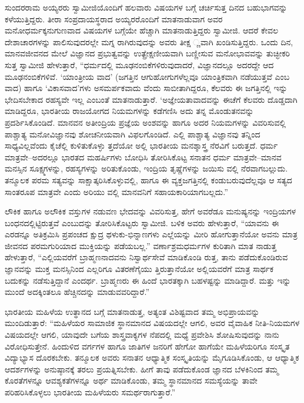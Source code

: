 ಸುಂದರರಾಮ ಅಯ್ಯರರು ಸ್ವಾಮೀಜಿಯೊಂದಿಗೆ ಹಲವಾರು ವಿಷಯಗಳ ಬಗ್ಗೆ ಚರ್ಚಿಸುತ್ತ ದಿನದ ಬಹುಭಾಗವನ್ನು ಕಳೆಯುತ್ತಿದ್ದರು. ತೀರಾ ಸಂಪ್ರದಾಯಸ್ಥರಾದ ಅಯ್ಯರರೊಂದಿಗೆ ಮಾತನಾಡುವಾಗ ಅವರ ಮನೋಧರ್ಮಕ್ಕನುಗುಣವಾದ ವಿಷಯಗಳ ಬಗ್ಗೆಯೇ ಹೆಚ್ಚಾಗಿ ಮಾತನಾಡುತ್ತಿದ್ದರು ಸ್ವಾಮೀಜಿ. ಆದರೆ ಕೇವಲ ದೇಶಾಚಾರಗಳನ್ನು ಪಾಲಿಸುವುದರಲ್ಲೇ ಮಗ್ನ ರಾಗಿರುವುದನ್ನು ಅವರು ತೀಕ್ಷ ್ಣವಾಗಿ ಖಂಡಿಸುತ್ತಿದ್ದರು. ಒಂದು ದಿನ, ಮಾನವಜೀವನದ ಮೇಲೆ ವಿಜ್ಞಾನದ ಪ್ರಭುತ್ವವನ್ನು ಉತ್ಪ್ರೇಕ್ಷಣೀಯವಾಗಿ ಬಣ್ಣೀಸುವ ಮನೋಭಾವವನ್ನು ತುಚ್ಛೀಕರಿ ಸುತ್ತ ಸ್ವಾಮೀಜಿ ಹೇಳುತ್ತಾರೆ, “ಧರ್ಮದಲ್ಲಿ ಮೂಢನಂಬಿಕೆಗಳಿರುವುದಾದರೆ, ವಿಜ್ಞಾನದಲ್ಲೂ ಅದರದ್ದೇ ಆದ ಮೂಢನಂಬಿಕೆಗಳಿವೆ. ‘ಯಾಂತ್ರೀಯ ವಾದ’ (ಜಗತ್ತಿನ ಆಗುಹೋಗುಗಳೆಲ್ಲವೂ ಯಾಂತ್ರಿಕವಾಗಿ ನಡೆಯುತ್ತವೆ ಎಂಬ ವಾದ) ಹಾಗೂ ‘ವಿಕಾಸವಾದ’ಗಳು ಅಸಮರ್ಪಕವಾದು ವೆಂದು ಸಾಬೀತಾಗಿದ್ದರೂ, ಕೆಲವರು ಈ ಜಗತ್ತಿನಲ್ಲಿ ಇನ್ನು ಭೇದಿಸಬೇಕಾದ ರಹಸ್ಯವೇ ಇಲ್ಲ ಎಂಬಂತೆ ಮಾತನಾಡುತ್ತಾರೆ. ‘ಅಜ್ಞೇಯತಾವಾದವನ್ನು ಈಚೆಗೆ ಕೆಲವರು ದೊಡ್ಡದಾಗಿ ಮಾಡಿದ್ದರೂ, ಭಾರತೀಯ ರಾಜಯೋಗದ ನಿಯಮಗಳನ್ನು ಕಡೆಗಣಿಸಿ ಅದು ತನ್ನ ಮೊಂಡುತನವನ್ನು ಪ್ರದರ್ಶಿಸಿಕೊಂಡಿದೆ. ಮಾನವನ ಅತೀಂದ್ರಿಯ ಪ್ರಜ್ಞೆಯ ಅಂಶವನ್ನು ಹಾಗೂ ಅದರ ನಿಯಮಗಳನ್ನು ವಿವರಿಸುವಲ್ಲಿ ಪಾಶ್ಚಾತ್ಯ ಮನೋವಿಜ್ಞಾನವು ಶೋಚನೀಯವಾಗಿ ವಿಫಲಗೊಂಡಿದೆ. ಎಲ್ಲಿ ಪಾಶ್ಚಾತ್ಯ ವಿಜ್ಞಾನವು ತನ್ನಿಂದ ಸಾಧ್ಯವಿಲ್ಲವೆಂದು ಕೈಚೆಲ್ಲಿ ಕುಳಿತುಕೊಳ್ಳು ತ್ತದೆಯೋ ಅಲ್ಲಿ ಭಾರತೀಯ ಮನಶ್ಶಾಸ್ತ್ರ ನೆರವಿಗೆ ಬರುತ್ತದೆ. ಧರ್ಮ ಮಾತ್ರವೇ–ಅದರಲ್ಲೂ ಭಾರತದ ಮಹರ್ಷಿಗಳು ಬೋಧಿಸಿ ತೋರಿಸಿಕೊಟ್ಟ ಸನಾತನ ಧರ್ಮ ಮಾತ್ರವೇ–ಮಾನವ ಮನಸ್ಸಿನ ಸೂಕ್ಷ್ಮಗಳನ್ನು, ರಹಸ್ಯಗಳನ್ನು ಅರಿತುಕೊಂಡು, ಇಂದ್ರಿಯ ತೃಷ್ಣೆಗಳನ್ನು ಜಯಿಸು ವಲ್ಲಿ ನೆರವಾಗಬಲ್ಲುದು. ತನ್ಮೂಲಕ ಪರಮ ಸತ್ಯವನ್ನು ಸಾಕ್ಷಾತ್ಕರಿಸಿಕೊಳ್ಳುವಲ್ಲಿ, ಹಾಗೂ ಈ ವ್ಯಕ್ತಜಗತ್ತಿನಲ್ಲಿ ಕಂಡುಬರುವುದೆಲ್ಲವೂ ಆ ಸತ್ಯದ ಸಾಂತರೂಪ ಮಾತ್ರವೇ ಎಂದು ಅರಿಯು ವಲ್ಲಿ ಮಾನವನಿಗೆ ಸಹಾಯಕಾರಿಯಾಗಬಲ್ಲದು.”

ಲೌಕಿಕ ಹಾಗೂ ಅಲೌಕಿಕ ವಸ್ತುಗಳ ನಡುವಣ ಭೇದವನ್ನು ವಿವರಿಸುತ್ತ, ಹೇಗೆ ಅವರೆಡೂ ಮನುಷ್ಯನನ್ನು ಇಂದ್ರಿಯಗಳ ಬಂಧನದಲ್ಲಿಟ್ಟಿರುತ್ತವೆ ಎಂಬುದನ್ನು ತೋರಿಸಿಕೊಟ್ಟರು ಸ್ವಾಮೀಜಿ. ಬಳಿಕ ಅವರು ಹೇಳುತ್ತಾರೆ, “ಯಾವನು ಈ ಎರಡನ್ನೂ ಅತಿಕ್ರಮಿಸಿ ಪ್ರಪಂಚದ ಕ್ಷುದ್ರ ಥಳುಕು-ಭಿನ್ನಾಣಗಳು ಎಲ್ಲೆಯನ್ನು ಮೀರಿ ಹೋಗುತ್ತಾನೆಯೋ ಅವನು ಮಾತ್ರ ಜೀವನದ ಪರಮಗುರಿಯಾದ ಮುಕ್ತಿಯನ್ನು ಪಡೆಯಬಲ್ಲ.” ವರ್ಣಾಶ್ರಮಧರ್ಮಗಳ ಕುರಿತಾಗಿ ಮಾತ ನಾಡುತ್ತ ಹೇಳುತ್ತಾರೆ, “ಎಲ್ಲಿಯವರೆಗೆ ಬ್ರಾಹ್ಮಣನಾದವನು ನಿಸ್ವಾರ್ಥಸೇವೆ ಮಾಡಿಕೊಂಡಿ ರುತ್ತ, ತಾನು ಪಡೆದುಕೊಂಡಿರುವ ಜ್ಞಾನವನ್ನು ಮುಕ್ತ ಮನಸ್ಸಿನಿಂದ ಎಲ್ಲರಿಗೂ ವಿತರಣೆಗೈಯು ತ್ತಿರುತ್ತಾನೆಯೋ ಅಲ್ಲಿಯವರೆಗೆ ಮಾತ್ರ ಸಾರ್ಥಕ ಬದುಕನ್ನು ನಡೆಸುತ್ತಿದ್ದಾನೆ ಎಂದರ್ಥ. ಬ್ರಾಹ್ಮಣರು ಈ ಹಿಂದೆ ಭಾರತಕ್ಕಾಗಿ ಬಹಳಷ್ಟನ್ನು ಮಾಡಿದ್ದಾರೆ. ಮತ್ತು ಇನ್ನು ಮುಂದೆ ಅದಕ್ಕಿಂತಲೂ ಹೆಚ್ಚಿನದನ್ನು ಮಾಡುವವರಿದ್ದಾರೆ.”

ಭಾರತೀಯ ಮಹಿಳೆಯ ಉತ್ಥಾನದ ಬಗ್ಗೆ ಮಾತನಾಡುತ್ತ, ಅತ್ಯಂತ ವಿಶಿಷ್ಟವಾದ ತಮ್ಮ ಅಭಿಪ್ರಾಯವನ್ನು ಮುಂದಿಡುತ್ತಾರೆ: “ಮಹಿಳೆಯರ ಸಾಮಾಜಿಕ ಸ್ಥಾನಮಾನದ ವಿಷಯದಲ್ಲೇ ಆಗಲಿ, ಅವರ ವೈವಾಹಿಕ ನೀತಿ-ನಿಯಮಗಳ ವಿಷಯದಲ್ಲೇ ಆಗಲಿ, ಯಾವುದೇ ಬಗೆಯ ಶಾಸ್ತ್ರವಾಕ್ಯಗಳ ನೆಪದಲ್ಲಿ ಮಧ್ಯೆ ಪ್ರವೇಶಿಸಿ ಶೋಷಿಸುವುದನ್ನು ನಾನು ವಿರೋಧಿಸುತ್ತೇನೆ. ಹಿಂದುಳಿದ ವರ್ಗಗಳ ಹಾಗೂ ಜಾತಿಗಳ ಜನರಿಗೆ ಹೇಗೋ ಹಾಗೆಯೇ ಮಹಿಳೆಯರಿಗೂ ಸಂಸ್ಕೃತ ವಿದ್ಯಾಭ್ಯಾಸ ದೊರಕಬೇಕು. ತನ್ಮೂಲಕ ಅವರು ಸನಾತನ ಆಧ್ಯಾತ್ಮಿಕ ಸಂಸ್ಕೃತಿಯನ್ನು ಮೈಗೂಡಿಸಿಕೊಂಡು, ಆ ಆಧ್ಯಾತ್ಮಿಕ ಆದರ್ಶಗಳನ್ನು ಅನುಷ್ಠಾನಕ್ಕೆ ತರಲು ಪ್ರಯತ್ನಿಸಬೇಕು. ಹೀಗೆ ತಾವು ಪಡೆದುಕೊಂಡ ಜ್ಞಾನದ ಬೆಳಕಿನಿಂದ ತಮ್ಮ ಕೊರತೆಗಳನ್ನೂ ಆವಶ್ಯಕತೆಗಳನ್ನೂ ಅರ್ಥ ಮಾಡಿಕೊಂಡು, ತಮ್ಮ ಸ್ಥಾನಮಾನದ ಸಮಸ್ಯೆಯನ್ನು ತಾವೇ ಪರಿಹರಿಸಿಕೊಳ್ಳಲು ಭಾರತೀಯ ಮಹಿಳೆಯರು ಸಮರ್ಥರಾಗುತ್ತಾರೆ.”

